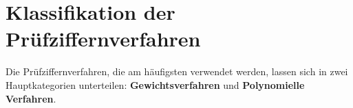 
\chapter{Klassifikation der Prüfziffernverfahren}
\label{ch:klassifikation}

Die Prüfziffernverfahren, die am häufigsten verwendet werden, lassen sich in zwei Hauptkategorien unterteilen: \textbf{Gewichtsverfahren} und \textbf{Polynomielle Verfahren}.

